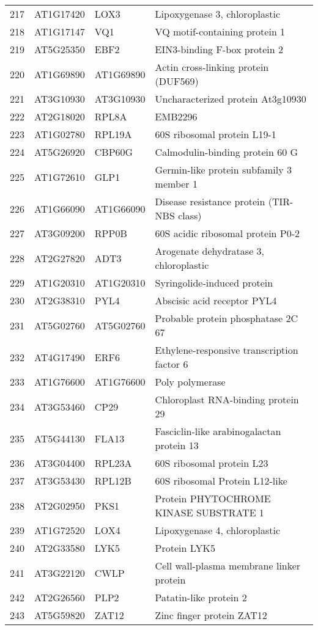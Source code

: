 \documentclass[a4paper]{article}
\begin{document}
\begin{center}
\begin{tabular}{rlll}
217 & AT1G17420 & LOX3 & Lipoxygenase 3, chloroplastic\\
218 & AT1G17147 & VQ1 & VQ motif-containing protein 1\\
219 & AT5G25350 & EBF2 & EIN3-binding F-box protein 2\\
220 & AT1G69890 & AT1G69890 & Actin cross-linking protein (DUF569)\\
221 & AT3G10930 & AT3G10930 & Uncharacterized protein At3g10930\\
222 & AT2G18020 & RPL8A & EMB2296\\
223 & AT1G02780 & RPL19A & 60S ribosomal protein L19-1\\
224 & AT5G26920 & CBP60G & Calmodulin-binding protein 60 G\\
225 & AT1G72610 & GLP1 & Germin-like protein subfamily 3 member 1\\
226 & AT1G66090 & AT1G66090 & Disease resistance protein (TIR-NBS class)\\
227 & AT3G09200 & RPP0B & 60S acidic ribosomal protein P0-2\\
228 & AT2G27820 & ADT3 & Arogenate dehydratase 3, chloroplastic\\
229 & AT1G20310 & AT1G20310 & Syringolide-induced protein\\
230 & AT2G38310 & PYL4 & Abscisic acid receptor PYL4\\
231 & AT5G02760 & AT5G02760 & Probable protein phosphatase 2C 67\\
232 & AT4G17490 & ERF6 & Ethylene-responsive transcription factor 6\\
233 & AT1G76600 & AT1G76600 & Poly polymerase\\
234 & AT3G53460 & CP29 & Chloroplast RNA-binding protein 29\\
235 & AT5G44130 & FLA13 & Fasciclin-like arabinogalactan protein 13\\
236 & AT3G04400 & RPL23A & 60S ribosomal protein L23\\
237 & AT3G53430 & RPL12B & 60S ribosomal Protein L12-like\\
238 & AT2G02950 & PKS1 & Protein PHYTOCHROME KINASE SUBSTRATE 1\\
239 & AT1G72520 & LOX4 & Lipoxygenase 4, chloroplastic\\
240 & AT2G33580 & LYK5 & Protein LYK5\\
241 & AT3G22120 & CWLP & Cell wall-plasma membrane linker protein\\
242 & AT2G26560 & PLP2 & Patatin-like protein 2\\
243 & AT5G59820 & ZAT12 & Zinc finger protein ZAT12\\

\end{tabular}
\end{center}
\end{document}
